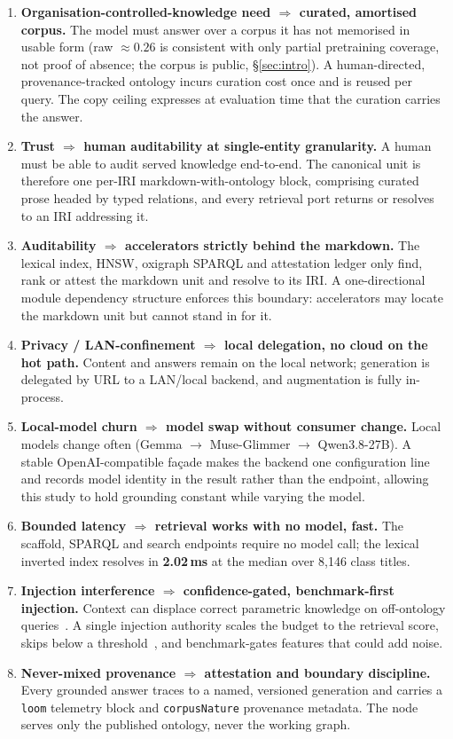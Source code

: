 \documentclass[10pt,twocolumn]{article}
\begin{document}
\begin{enumerate}[topsep=3pt,itemsep=2pt,leftmargin=1.5em]
\item \textbf{Organisation-controlled-knowledge need $\Rightarrow$ curated, amortised corpus.} The model must
answer over a corpus it has not memorised in usable form (raw $\approx0.26$ is consistent with only
partial pretraining coverage, not proof of absence; the corpus is public, \S\ref{sec:intro}). A human-directed, provenance-tracked ontology incurs curation cost once
and is reused per query. The copy ceiling expresses at evaluation time that the curation carries
the answer.
\item \textbf{Trust $\Rightarrow$ human auditability at single-entity granularity.} A human must
be able to audit served knowledge end-to-end. The canonical unit is therefore one per-IRI
markdown-with-ontology block, comprising curated prose headed by typed relations, and every
retrieval port returns or resolves to an IRI addressing it.
\item \textbf{Auditability $\Rightarrow$ accelerators strictly behind the markdown.} The lexical
index, HNSW, oxigraph SPARQL and attestation ledger only find, rank or attest the markdown unit and
resolve to its IRI. A one-directional module dependency structure enforces this boundary: accelerators may locate the markdown unit but cannot stand in for it.
\item \textbf{Privacy / LAN-confinement $\Rightarrow$ local delegation, no cloud on the hot path.}
Content and answers remain on the local network; generation is delegated by URL to a LAN/local
backend, and augmentation is fully in-process.
\item \textbf{Local-model churn $\Rightarrow$ model swap without consumer change.} Local models
change often (Gemma $\to$ Muse-Glimmer $\to$ Qwen3.8-27B). A stable OpenAI-compatible façade makes
the backend one configuration line and records model identity in the result rather than the
endpoint, allowing this study to hold grounding constant while varying the model.
\item \textbf{Bounded latency $\Rightarrow$ retrieval works with no model, fast.} The scaffold,
SPARQL and search endpoints require no model call; the lexical inverted index resolves in
\textbf{2.02\,ms} at the median over 8{,}146 class titles.
\item \textbf{Injection interference $\Rightarrow$ confidence-gated, benchmark-first injection.}
Context can displace correct parametric knowledge on off-ontology
queries~\cite{shi2023distracted,yoran2024robust,longpre2021entity}. A single injection authority
scales the budget to the retrieval score, skips below a threshold~\cite{mallen2023trust}, and
benchmark-gates features that could add noise.
\item \textbf{Never-mixed provenance $\Rightarrow$ attestation and boundary discipline.} Every
grounded answer traces to a named, versioned generation and carries a \texttt{loom} telemetry block
and \texttt{corpusNature} provenance metadata. The node serves only the published ontology, never the
working graph.
\end{enumerate}
\end{document}
